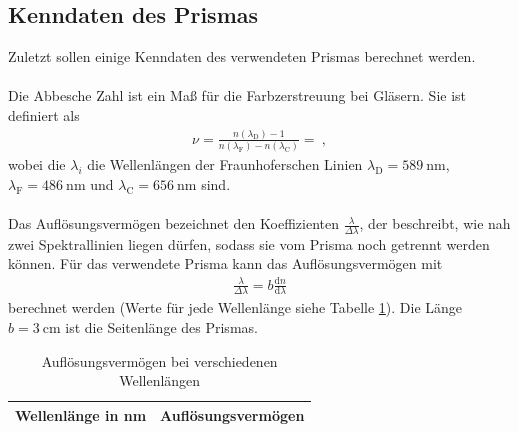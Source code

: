 \subsection{Kenndaten des Prismas}
Zuletzt sollen einige Kenndaten des verwendeten Prismas berechnet werden. \\
\ \\
Die Abbesche Zahl ist ein Maß für die Farbzerstreuung bei Gläsern. Sie ist definiert als
\begin{align}
	\nu = \frac{n(\lambda_\text{D})-1}{n(\lambda_\text{F})-n(\lambda_\text{C})} =  \ ,
\end{align}
wobei die $\lambda_i$ die Wellenlängen der Fraunhoferschen Linien $\lambda_\text{D} = \SI{589}{\nano\meter}$, $\lambda_\text{F} = \SI{486}{\nano\meter}$ und $\lambda_\text{C} = \SI{656}{\nano\meter}$ sind. \\
\ \\
Das Auflösungsvermögen bezeichnet den Koeffizienten $\frac{\lambda}{\Delta\lambda}$, der beschreibt, wie nah zwei Spektrallinien liegen dürfen, sodass sie vom Prisma noch getrennt werden können. Für das verwendete Prisma kann das Auflösungsvermögen mit
\begin{align*}
	\frac{\lambda}{\Delta\lambda} = b\frac{\text{d}n}{\text{d}\lambda}
\end{align*}
berechnet werden (Werte für jede Wellenlänge siehe Tabelle \ref{tab:Aufl}). Die Länge $b=\SI{3}{\centi\meter}$ ist die Seitenlänge des Prismas.
\begin{table}[h!]
	\centering
	\begin{tabular}{c|c}
		Wellenlänge in \si{\nano\meter} & Auflösungsvermögen \\
		\hline
		
	\end{tabular}
	\caption{Auflösungsvermögen bei verschiedenen Wellenlängen}
	\label{tab:Aufl}
\end{table}

\clearpage


